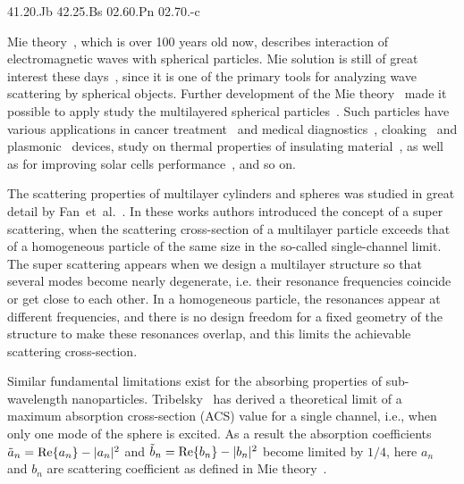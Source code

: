 \documentclass[aps,prl,twocolumn,showpacs,superscriptaddress,groupedaddress]{revtex4-1}
\begin{document}
\pacs%
{41.20.Jb 42.25.Bs 02.60.Pn 02.70.-c}

\maketitle %

Mie theory~\cite{Mie-1908}, which is over 100 years old now, describes
interaction of electromagnetic waves with spherical particles. Mie
solution is still of great interest these
days~\cite{Suzuki-2008,MacKowski-2012,Lerme-2000,Xu-2005,Li-2006,Gogoi-2010,Santiago-2011},
since it is one of the primary tools for analyzing wave scattering by
spherical objects. Further development of the Mie
theory~\cite{Yang-2003, Pena-scattnlay-2009} made it possible to apply
study the multilayered spherical
particles~\cite{Sheehan-2013,Selmke-2012}.  Such particles have
various applications in cancer treatment~\cite{Zhang-2010,
  Hirsch-2003} and medical diagnostics~\cite{Allain-2002},
cloaking~\cite{Qui-2009, Semouchkina-2013, Ladutenko-2014} and
plasmonic~\cite{Martin-2013, Alu-2005} devices, study on thermal
properties of insulating material~\cite{Xie-2013}, as well as for
improving solar cells performance~\cite{Kameya-2011,Mann-2011}, and so
on.

The scattering properties of multilayer cylinders and spheres was
studied in great detail by Fan~et~al.~\cite{Fan-2010,Fan-2011}.  In these
works authors introduced the concept of a super scattering, when the
scattering cross-section of a multilayer particle exceeds that of a
homogeneous particle of the same size in the so-called single-channel
limit. The super scattering appears when we design a multilayer
structure so that several modes become nearly degenerate, i.e. their
resonance frequencies coincide or get close to each other. In a
homogeneous particle, the resonances appear at different frequencies,
and there is no design freedom for a fixed geometry of the structure
to make these resonances overlap, and this limits the achievable
scattering cross-section.

Similar fundamental limitations exist for the absorbing properties of
sub-wavelength nanoparticles.  Tribelsky~\cite{Tribelsky-2011} has derived a
theoretical limit of a maximum absorption cross-section (ACS) value
for a single channel, i.e., when only one mode of the sphere is
excited.  As a result the absorption coefficients $\tilde{a}_n= {\rm
  Re}\{a_n\} - |a_n|^2 $ and $\tilde{b}_n= {\rm Re}\{b_n\} - |b_n|^2 $
become limited by $1/4$, here $a_n$ and $b_n$ are scattering
coefficient as defined in Mie theory~\cite{Bohren-1983}.
\end{document}
